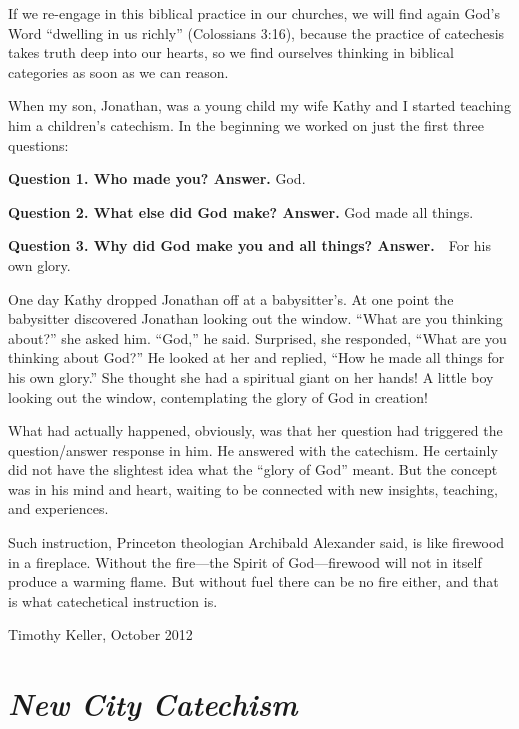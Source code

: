 \documentclass[titlepage]{memoir}
\begin{document}
If we re-engage in this biblical practice in our churches, we will find again God's Word ``dwelling in us richly'' (Colossians 3:16), because the practice of catechesis takes truth deep into our hearts, so we find ourselves thinking in biblical categories as soon as we can reason.

When my son, Jonathan, was a young child my wife Kathy and I started teaching him a children's catechism. In the beginning we worked on just the first three questions:

\textbf{Question 1. Who made you?\newline
Answer.} God.

\textbf{Question 2. What else did God make?\newline
Answer.} God made all things.

\textbf{Question 3. Why did God make you and all things?\newline
Answer.}\ \ For his own glory.

One day Kathy dropped Jonathan off at a babysitter's. At one point the babysitter discovered Jonathan looking out the window. ``What are you thinking about?'' she asked him. ``God,'' he said. Surprised, she responded, ``What are you thinking about God?'' He looked at her and replied, ``How he made all things for his own glory.'' She thought she had a spiritual giant on her hands! A little boy looking out the window, contemplating the glory of God in creation!

What had actually happened, obviously, was that her question had triggered the question/answer response in him. He answered with the catechism. He certainly did not have the slightest idea what the ``glory of God'' meant. But the concept was in his mind and heart, waiting to be connected with new insights, teaching, and experiences.

Such instruction, Princeton theologian Archibald Alexander said, is like firewood in a fireplace. Without the fire\thinspace{}---\thinspace{}the Spirit of God\thinspace{}---\thinspace{}firewood will not in itself produce a warming flame. But without fuel there can be no fire either, and that is what catechetical instruction is.

\bigskip

{\raggedleft
Timothy Keller, October 2012}

\cleardoublepage

\chapter{\em New City Catechism}
\end{document}

